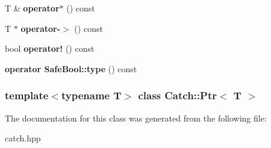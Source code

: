 \begin{DoxyCompactItemize}
\item 
\hypertarget{classCatch_1_1Ptr_a3a4c139032a8bd1bffa553103d5dbfd3}{
T \& {\bfseries operator$\ast$} () const }
\label{classCatch_1_1Ptr_a3a4c139032a8bd1bffa553103d5dbfd3}

\item 
\hypertarget{classCatch_1_1Ptr_afaa13250d5e0ae5a440726d5e5aa7295}{
T $\ast$ {\bfseries operator-\/$>$} () const }
\label{classCatch_1_1Ptr_afaa13250d5e0ae5a440726d5e5aa7295}

\item 
\hypertarget{classCatch_1_1Ptr_aea1a99ded6d62423ccb9173fab91b56e}{
bool {\bfseries operator!} () const }
\label{classCatch_1_1Ptr_aea1a99ded6d62423ccb9173fab91b56e}

\item 
\hypertarget{classCatch_1_1Ptr_a27234c04feec43ffe0fd08e045557448}{
{\bfseries operator SafeBool::type} () const }
\label{classCatch_1_1Ptr_a27234c04feec43ffe0fd08e045557448}

\end{DoxyCompactItemize}
\subsubsection*{template$<$typename T$>$ class Catch::Ptr$<$ T $>$}



The documentation for this class was generated from the following file:\begin{DoxyCompactItemize}
\item 
catch.hpp\end{DoxyCompactItemize}
